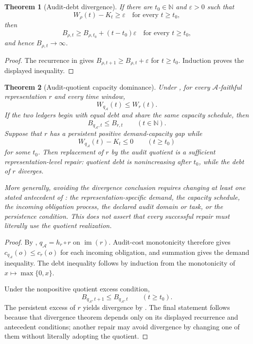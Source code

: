 \documentclass[11pt]{article}
\newcommand{\AuditQuot}{\ensuremath{q_{\mathcal A}}}
\newcommand{\Debt}{\ensuremath{B}}
\newcommand{\Demand}{\ensuremath{W}}
\newcommand{\AuditCap}{\ensuremath{K}}
\theoremstyle{plain}
\newtheorem{theorem}{Theorem}[section]
\theoremstyle{definition}
\theoremstyle{remark}
\begin{document}
\begin{theorem}[Audit-debt divergence]
\label{thm:debt-v10}
If there are $t_0\in\mathbb N$ and $\varepsilon>0$ such that
\[
  \Demand_\rho(t)-\AuditCap_t\geq\varepsilon
  \quad\text{for every }t\geq t_0,
\]
then
\[
  \Debt_{\rho,t}\geq\Debt_{\rho,t_0}+(t-t_0)\varepsilon
  \quad\text{for every }t\geq t_0,
\]
and hence $\Debt_{\rho,t}\to\infty$.
\end{theorem}

\begin{proof}
The recurrence in  gives
$\Debt_{\rho,t+1}\geq\Debt_{\rho,t}+\varepsilon$ for $t\geq t_0$.
Induction proves the displayed inequality.
\end{proof}

\begin{theorem}[Audit-quotient capacity dominance]
\label{thm:capacity-v10}
Under , for every $\mathcal A$-faithful representation
$r$ and every time window,
\[
  \Demand_{\AuditQuot}(t)\leq\Demand_r(t).
\]
If the two ledgers begin with equal debt and share the same capacity schedule,
then
\[
  \Debt_{\AuditQuot,t}\leq\Debt_{r,t}
  \qquad(t\in\mathbb N).
\]
Suppose that $r$ has a persistent positive demand-capacity gap while
\[
  \Demand_{\AuditQuot}(t)-\AuditCap_t\leq0
  \qquad(t\geq t_0)
\]
for some $t_0$.  Then replacement of $r$ by the audit quotient is a sufficient
representation-level repair: quotient debt is nonincreasing after $t_0$, while
the debt of $r$ diverges.

More generally, avoiding the divergence conclusion requires changing at least
one stated antecedent of : the representation-specific
demand, the capacity schedule, the incoming obligation process, the declared
audit domain or task, or the persistence condition.  This does not assert that
every successful repair must literally use the quotient realization.
\end{theorem}

\begin{proof}
By , $\AuditQuot=h_r\circ r$ on
$\operatorname{im}(r)$.  Audit-cost monotonicity therefore gives
$c_{\AuditQuot}(o)\leq c_r(o)$ for each incoming obligation, and summation gives
the demand inequality.  The debt inequality follows by induction from the
monotonicity of $x\mapsto\max\{0,x\}$.

Under the nonpositive quotient excess condition,
\[
  \Debt_{\AuditQuot,t+1}\leq\Debt_{\AuditQuot,t}
  \qquad(t\geq t_0).
\]
The persistent excess of $r$ yields divergence by .  The
final statement follows because that divergence theorem depends only on its
displayed recurrence and antecedent conditions; another repair may avoid
divergence by changing one of them without literally adopting the quotient.
\end{proof}
\end{document}
